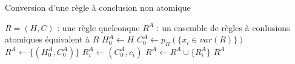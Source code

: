 
\begin{center}
\begin{algorithm}[h]
\caption{Conversion d'une règle à conclusion non atomique}\label{algo_conversion}
\begin{algorithmic}[1]
\REQUIRE	$R = (H,C)$ : une règle quelconque 
\ENSURE		$R^A$ : un ensemble de règles à conlusions atomiques équivalent à $R$
	\STATE $H^A_0 \leftarrow H$
	\STATE $C^A_0 \leftarrow p_R(\{x_i \in var(R)\})$
	\STATE $R^A \leftarrow \{(H^A_0,C^A_0)\}$
		\STATE $R^A_i \leftarrow (C^A_0,c_i)$
		\STATE $R^A \leftarrow R^A \cup \{R^A_i\}$
	\ENDFOR
	\RETURN $R^A$
\end{algorithmic}
\end{algorithm}
\end{center}
